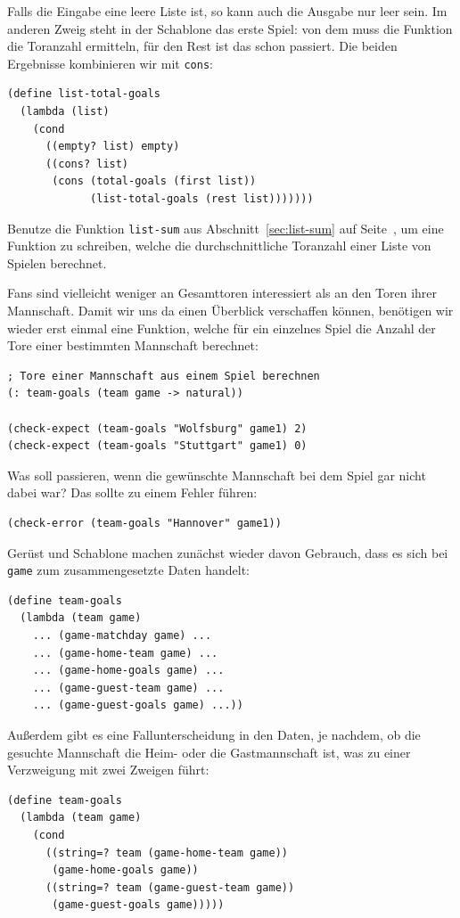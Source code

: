 %
Falls die Eingabe eine leere Liste ist, so kann auch die Ausgabe nur
leer sein.  Im anderen Zweig steht in der Schablone das erste Spiel:
von dem muss die Funktion die Toranzahl ermitteln, für den Rest ist
das schon passiert.  Die beiden Ergebnisse kombinieren wir mit
\lstinline{cons}:
%
\begin{lstlisting}
(define list-total-goals
  (lambda (list)
    (cond
      ((empty? list) empty)
      ((cons? list)
       (cons (total-goals (first list))
             (list-total-goals (rest list)))))))
\end{lstlisting}
%
\begin{aufgabeinline}
  Benutze die Funktion \lstinline{list-sum} aus
  Abschnitt~\ref{sec:list-sum} auf Seite~\pageref{sec:list-sum}, um
  eine Funktion zu schreiben, welche die durchschnittliche Toranzahl
  einer Liste von Spielen berechnet.
\end{aufgabeinline}
%
Fans sind vielleicht weniger an Gesamttoren interessiert als an den
Toren ihrer Mannschaft.  Damit wir uns da einen Überblick verschaffen
können, benötigen wir wieder erst einmal eine Funktion, welche für ein
einzelnes Spiel die Anzahl der Tore einer bestimmten Mannschaft berechnet:
%
\begin{lstlisting}
; Tore einer Mannschaft aus einem Spiel berechnen
(: team-goals (team game -> natural))

(check-expect (team-goals "Wolfsburg" game1) 2)
(check-expect (team-goals "Stuttgart" game1) 0)
\end{lstlisting}
%
Was soll passieren, wenn die gewünschte Mannschaft bei dem Spiel gar nicht
dabei war?  Das sollte zu einem Fehler führen:
%
\begin{lstlisting}
(check-error (team-goals "Hannover" game1))
\end{lstlisting}
%
Gerüst und Schablone machen zunächst wieder davon Gebrauch, dass es
sich bei \lstinline{game} zum zusammengesetzte Daten handelt:
%
\begin{lstlisting}
(define team-goals
  (lambda (team game)
    ... (game-matchday game) ...
    ... (game-home-team game) ...
    ... (game-home-goals game) ...
    ... (game-guest-team game) ...
    ... (game-guest-goals game) ...))
\end{lstlisting}
%
Außerdem gibt es eine Fallunterscheidung in den Daten, je nachdem, ob
die gesuchte Mannschaft die Heim- oder die Gastmannschaft ist, was zu
einer Verzweigung mit zwei Zweigen führt:
%
\begin{lstlisting}
(define team-goals
  (lambda (team game)
    (cond
      ((string=? team (game-home-team game))
       (game-home-goals game))
      ((string=? team (game-guest-team game))
       (game-guest-goals game)))))
\end{lstlisting}

